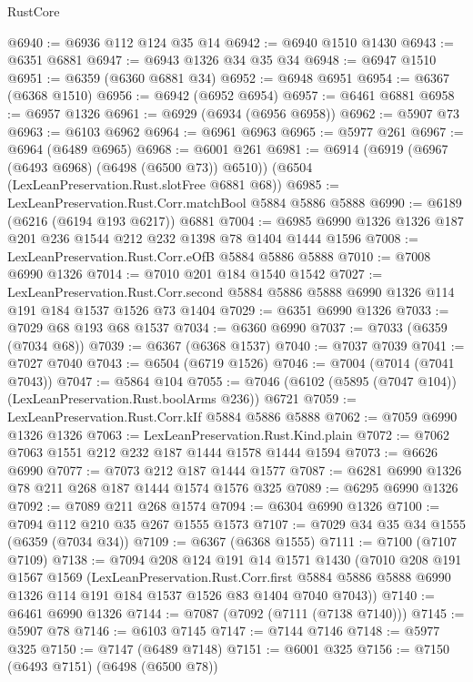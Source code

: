 \begin{lexlean}{RustCore}
\begin{coremodule}
@6940 := @6936 @112 @124 @35 @14
@6942 := @6940 @1510 @1430
@6943 := @6351 @6881
@6947 := @6943 @1326 @34 @35 @34
@6948 := @6947 @1510
@6951 := @6359 (@6360 @6881 @34)
@6952 := @6948 @6951
@6954 := @6367 (@6368 @1510)
@6956 := @6942 (@6952 @6954)
@6957 := @6461 @6881
@6958 := @6957 @1326
@6961 := @6929 (@6934 (@6956 @6958))
@6962 := @5907 @73
@6963 := @6103 @6962
@6964 := @6961 @6963
@6965 := @5977 @261
@6967 := @6964 (@6489 @6965)
@6968 := @6001 @261
@6981 := @6914
    (@6919 (@6967 (@6493 @6968) (@6498 (@6500 @73)) @6510))
    (@6504 (LexLeanPreservation.Rust.slotFree @6881 @68))
@6985 := LexLeanPreservation.Rust.Corr.matchBool @5884 @5886 @5888
@6990 := @6189 (@6216 (@6194 @193 @6217)) @6881
@7004 := @6985 @6990 @1326 @1326 @187 @201 @236 @1544 @212 @232 @1398 @78 @1404 @1444 @1596
@7008 := LexLeanPreservation.Rust.Corr.eOfB @5884 @5886 @5888
@7010 := @7008 @6990 @1326
@7014 := @7010 @201 @184 @1540 @1542
@7027 := LexLeanPreservation.Rust.Corr.second
    @5884
    @5886
    @5888
    @6990
    @1326
    @114
    @191
    @184
    @1537
    @1526
    @73
    @1404
@7029 := @6351 @6990 @1326
@7033 := @7029 @68 @193 @68 @1537
@7034 := @6360 @6990
@7037 := @7033 (@6359 (@7034 @68))
@7039 := @6367 (@6368 @1537)
@7040 := @7037 @7039
@7041 := @7027 @7040
@7043 := @6504 (@6719 @1526)
@7046 := @7004 (@7014 (@7041 @7043))
@7047 := @5864 @104
@7055 := @7046 (@6102 (@5895 (@7047 @104)) (LexLeanPreservation.Rust.boolArms @236)) @6721
@7059 := LexLeanPreservation.Rust.Corr.kIf @5884 @5886 @5888
@7062 := @7059 @6990 @1326 @1326
@7063 := LexLeanPreservation.Rust.Kind.plain
@7072 := @7062 @7063 @1551 @212 @232 @187 @1444 @1578 @1444 @1594
@7073 := @6626 @6990
@7077 := @7073 @212 @187 @1444 @1577
@7087 := @6281 @6990 @1326 @78 @211 @268 @187 @1444 @1574 @1576 @325
@7089 := @6295 @6990 @1326
@7092 := @7089 @211 @268 @1574
@7094 := @6304 @6990 @1326
@7100 := @7094 @112 @210 @35 @267 @1555 @1573
@7107 := @7029 @34 @35 @34 @1555 (@6359 (@7034 @34))
@7109 := @6367 (@6368 @1555)
@7111 := @7100 (@7107 @7109)
@7138 := @7094
    @208
    @124
    @191
    @14
    @1571
    @1430
    (@7010
      @208
      @191
      @1567
      @1569
      (LexLeanPreservation.Rust.Corr.first
        @5884
        @5886
        @5888
        @6990
        @1326
        @114
        @191
        @184
        @1537
        @1526
        @83
        @1404
        @7040
        @7043))
@7140 := @6461 @6990 @1326
@7144 := @7087 (@7092 (@7111 (@7138 @7140)))
@7145 := @5907 @78
@7146 := @6103 @7145
@7147 := @7144 @7146
@7148 := @5977 @325
@7150 := @7147 (@6489 @7148)
@7151 := @6001 @325
@7156 := @7150 (@6493 @7151) (@6498 (@6500 @78))

\end{coremodule}
\end{lexlean}
